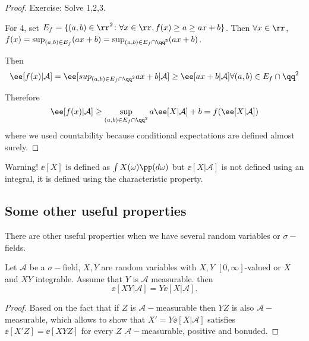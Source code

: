 \documentclass[../main.tex]{subfiles}
\begin{document}
    \begin{proof}
      Exercise: Solve 1,2,3.
      \vspace{0.4em}

      For 4, set $E_f = \{ (a, b) \in \rr^2 \colon \forall x \in \rr, f(x) \geq
      a \geq ax + b\}$. Then $\forall x \in \rr$, $f(x) = \sup_{(a, b) \in E_f}
      (ax + b) = \sup_{(a, b) \in E_f \cap \qq^2} (ax + b)$.

      Then $$\ee[f(x) | \mathcal{A}] = \ee[sup_{(a, b) \in E_f \cap \qq^2} ax +
      b | \mathcal{A}] \geq \ee[ax + b | \mathcal{A}] \forall (a, b) \in E_f
      \cap \qq^2$$

      Therefore
      \[
        \ee[f(x) | \mathcal{A} ] \geq \sup_{(a, b) \in E_f \cap \qq^2} a\ee[X
        | \mathcal{A}] + b = f(\ee[X | \mathcal{A}])
      \] 
      where we used countability because conditional expectations are defined
      almost surely.
    \end{proof}

    {\color{red} Warning!} $\ee[X]$ is defined as $\int X(\omega)\pp(d\omega)$ but $\ee[X
    | \mathcal{A}]$ is not defined using an integral, it is defined using the
    characteristic property.

    \subsection{Some other useful properties}
    There are other useful properties when we have several random variables or
    $\sigma-$fields.

    \begin{proposition}
        Let $\mathcal{A}$ be a $\sigma-$field, $X, Y$ are random variables with
        $X, Y$ $[0, \infty]$-valued or $X$ and $XY$ integrable. Assume that $Y$ is
        $\mathcal{A}$ measurable.
        then
        \[
          \ee[XY | \mathcal{A}] = Y \ee[X |\mathcal{A}]
        .\] 
    \end{proposition}
    \begin{proof}
        Based on the fact that if $Z$ is $\mathcal{A}-$measurable then $YZ$ is
        also $\mathcal{A}-$measurable, which allows to show that $ X' = Y\ee[X |
        \mathcal{A}]$ satisfies $\ee[X' Z] = \ee[XYZ]$ for every $Z$
        $\mathcal{A}-$measurable, positive and bonuded.
    \end{proof}
\end{document}
